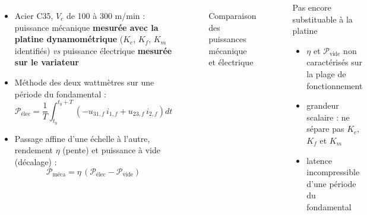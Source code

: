 \documentclass{style/presentation}
\begin{document}
\begin{frame}

    \begin{columns}[c]
        \begin{itemize}
            \item Acier C35, $V_c$ de 100 à 300 m/min : puissance mécanique \textbf{mesurée avec la platine dynamométrique} ($K_c$, $K_f$, $K_m$ identifiés) \textit{vs} puissance électrique \textbf{mesurée sur le variateur}
            \item Méthode des deux wattmètres sur une période du fondamental :
                  {\small
                  \begin{equation*}
                      \mathcal{P}_{\text{élec}} = \frac{1}{T}\int_{t_0}^{t_0+T} \left(-u_{31,f}\, i_{1,f} + u_{23,f}\, i_{2,f}\right) dt
                  \end{equation*}}
            \item Passage affine d'une échelle à l'autre, rendement $\eta$ (pente) et puissance à vide (décalage) :
                  \begin{equation*}
                      \mathcal{P}_{\text{méca}} = \eta\, \left(\mathcal{P}_{\text{élec}} - \mathcal{P}_{\text{vide}}\right)
                  \end{equation*}
        \end{itemize}

        \begin{figure}
            \centering
            {\fontsize{5pt}{5pt}\selectfont
                \def\svgwidth{0.72\textwidth}
                }
            \caption{Comparaison des puissances mécanique et électrique}
        \end{figure}
        \vspace{-2mm}
        \begin{alertblock}{Pas encore substituable à la platine}
            \begin{itemize}
                \item $\eta$ et $\mathcal{P}_{\text{vide}}$ non caractérisés sur la plage de fonctionnement
                \item grandeur scalaire : ne sépare pas $K_c$, $K_f$ et $K_m$
                \item latence incompressible d'une période du fondamental
            \end{itemize}
        \end{alertblock}
    \end{columns}
\end{frame}
\end{document}
